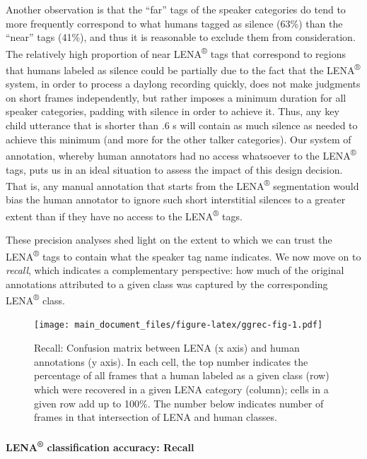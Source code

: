 \documentclass[english,table,man,floatsintext]{apa6}
\let\oldparagraph\paragraph
\renewcommand{\paragraph}[1]{\oldparagraph{#1}\mbox{}}
\begin{document}
Another observation is that the \enquote{far} tags of the speaker categories do tend to more frequently correspond to what humans tagged as silence (63\%) than the \enquote{near} tags (41\%), and thus it is reasonable to exclude them from consideration. The relatively high proportion of near LENA\textsuperscript{®} tags that correspond to regions that humans labeled as silence could be partially due to the fact that the LENA\textsuperscript{®} system, in order to process a daylong recording quickly, does not make judgments on short frames independently, but rather imposes a minimum duration for all speaker categories, padding with silence in order to achieve it. Thus, any key child utterance that is shorter than .6 s will contain as much silence as needed to achieve this minimum (and more for the other talker categories). Our system of annotation, whereby human annotators had no access whatsoever to the LENA\textsuperscript{®} tags, puts us in an ideal situation to assess the impact of this design decision. That is, any manual annotation that starts from the LENA\textsuperscript{®} segmentation would bias the human annotator to ignore such short interstitial silences to a greater extent than if they have no access to the LENA\textsuperscript{®} tags.

These precision analyses shed light on the extent to which we can trust the LENA\textsuperscript{®} tags to contain what the speaker tag name indicates. We now move on to \emph{recall}, which indicates a complementary perspective: how much of the original annotations attributed to a given class was captured by the corresponding LENA\textsuperscript{®} class.

\begin{figure}
\centering
\texttt{[image: main\_document\_files/figure-latex/ggrec-fig-1.pdf]}
\caption{\label{fig:ggrec-fig}Recall: Confusion matrix between LENA (x axis) and human annotations (y axis). In each cell, the top number indicates the percentage of all frames that a human labeled as a given class (row) which were recovered in a given LENA category (column); cells in a given row add up to 100\%. The number below indicates number of frames in that intersection of LENA and human classes.}
\end{figure}

\hypertarget{lena-classification-accuracy-recall}{%
\paragraph{\texorpdfstring{LENA\textsuperscript{®} classification accuracy: Recall}{LENA® classification accuracy: Recall}}\label{lena-classification-accuracy-recall}}
\end{document}
